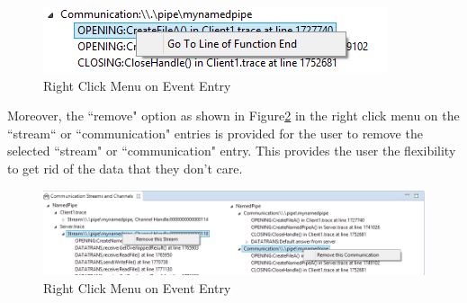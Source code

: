 \begin{figure}[H]
\centerline{\includegraphics{Figures/gotoend}}
 \caption{Right Click Menu on Event Entry}
\label{idenview}
\end{figure}

Moreover, the ``remove" option as shown in Figure\ref{remove} in the right click menu on the ``stream“ or ``communication" entries is provided for the user to remove the selected ``stream" or ``communication" entry. This provides the user the flexibility to get rid of the data that they don't care.

\begin{figure}[H]
\centerline{\includegraphics[scale=0.7]{Figures/remove}}
 \caption{Right Click Menu on Event Entry}
\label{remove}
\end{figure}


